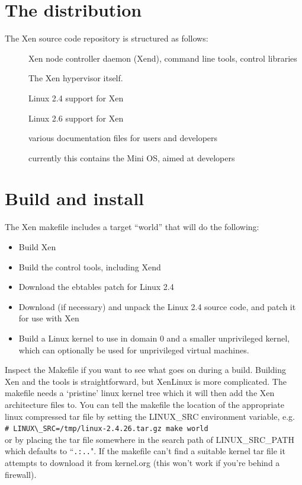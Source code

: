 \documentclass[11pt,twoside,final,openright]{xenstyle}
\begin{document}
\section{The distribution}

The Xen source code repository is structured as follows:

\begin{description}
\item[] Xen node controller daemon (Xend), command line tools, 
  control libraries
\item[] The Xen hypervisor itself.
\item[] Linux 2.4 support for Xen
\item[] Linux 2.6 support for Xen
\item[] various documentation files for users and developers
\item[] currently this contains the Mini OS, aimed at developers
\end{description}

\section{Build and install}

The Xen makefile includes a target ``world'' that will do the
following:

\begin{itemize}
\item Build Xen
\item Build the control tools, including Xend
\item Download the ebtables patch for Linux 2.4
\item Download (if necessary) and unpack the Linux 2.4 source code,
      and patch it for use with Xen
\item Build a Linux kernel to use in domain 0 and a smaller
      unprivileged kernel, which can optionally be used for
      unprivileged virtual machines.
\end{itemize}

Inspect the Makefile if you want to see what goes on during a
build. Building Xen and the tools is straightforward, but XenLinux is
more complicated. The makefile needs a `pristine' linux kernel tree
which it will then add the Xen architecture files to. You can tell the
makefile the location of the appropriate linux compressed tar file by
setting the LINUX\_SRC environment variable, e.g. \\
\verb!# LINUX\_SRC=/tmp/linux-2.4.26.tar.gz make world! \\ or by
placing the tar file somewhere in the search path of LINUX\_SRC\_PATH
which defaults to ``{\tt .:..}". If the makefile can't find a suitable
kernel tar file it attempts to download it from kernel.org (this won't
work if you're behind a firewall).
\end{document}
